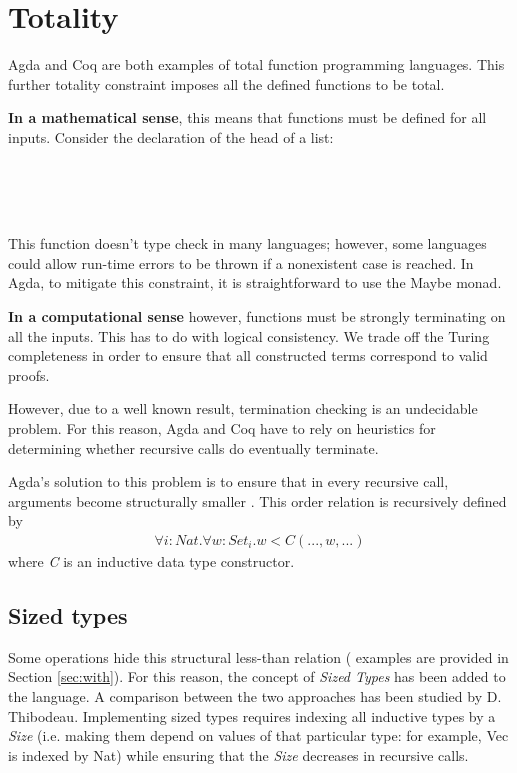 \documentclass[12pt,twoside,notitlepage]{report}
\begin{document}
\section{Totality}

Agda and Coq are both examples of total function programming languages. This further totality constraint imposes all the defined functions to be total.

\textbf{In a mathematical sense}, this means that functions must be defined for all inputs. Consider the declaration of the head of a list:

\begin{code}
\\
\> \AgdaSymbol{:}  \AgdaSymbol{\{}\AgdaSymbol{\}}     \<%
\\
\> \AgdaSymbol{(}  \AgdaSymbol{)} \AgdaSymbol{=} \<%
\\
\end{code}

This function doesn't type check in many languages; however, some languages could allow run-time errors to be thrown if a nonexistent case is reached. In Agda, to mitigate this constraint, it is straightforward to use the Maybe monad.

\textbf{In a computational sense} however, functions must be strongly terminating on all the inputs. This has to do with logical consistency. We trade off the Turing completeness in order to ensure that all constructed terms correspond to valid proofs.

However, due to a well known result, termination checking is an undecidable problem. For this reason, Agda and Coq have to rely on heuristics for determining whether recursive calls do eventually terminate.

Agda's solution to this problem is to ensure that in every recursive call, arguments become structurally smaller \cite{foetus}. This order relation is recursively defined by \begin{align*}
\forall i : Nat.\forall w : Set_i. w < C(...,w,...)
\end{align*}
where \textit{C} is an inductive data type constructor.

\subsection{Sized types}
\label{sec:sizedtypes}
Some operations hide this structural less-than relation ( examples are provided in Section \ref{sec:with}). For this reason, the concept of \textit{Sized Types} has been added to the language. A comparison between the two approaches has been studied by D. Thibodeau\cite{termination}. Implementing sized types requires indexing all inductive types by a \textit{Size} (i.e. making them depend on values of that particular type: for example, Vec is indexed by Nat) while ensuring that the \textit{Size} decreases in recursive calls. \cite{sizedtypes} 
\end{document}

